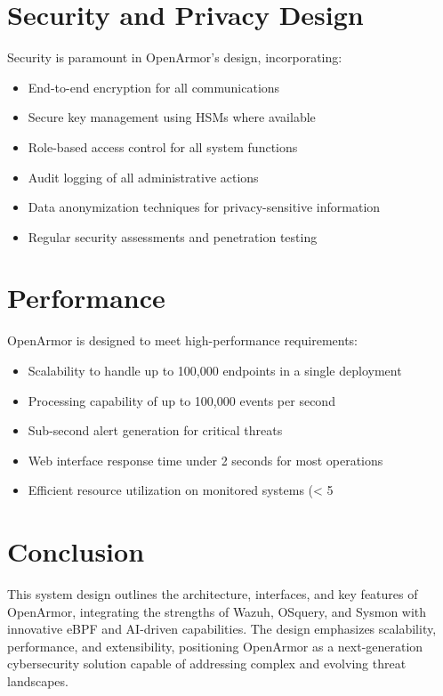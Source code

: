 \section{Security and Privacy Design}
Security is paramount in OpenArmor's design, incorporating:

\begin{itemize}
    \item End-to-end encryption for all communications
    \item Secure key management using HSMs where available
    \item Role-based access control for all system functions
    \item Audit logging of all administrative actions
    \item Data anonymization techniques for privacy-sensitive information
    \item Regular security assessments and penetration testing
\end{itemize}

\section{Performance}
OpenArmor is designed to meet high-performance requirements:

\begin{itemize}
    \item Scalability to handle up to 100,000 endpoints in a single deployment
    \item Processing capability of up to 100,000 events per second
    \item Sub-second alert generation for critical threats
    \item Web interface response time under 2 seconds for most operations
    \item Efficient resource utilization on monitored systems (< 5%
\end{itemize}

\section{Conclusion}
This system design outlines the architecture, interfaces, and key features of OpenArmor, integrating the strengths of Wazuh, OSquery, and Sysmon with innovative eBPF and AI-driven capabilities. The design emphasizes scalability, performance, and extensibility, positioning OpenArmor as a next-generation cybersecurity solution capable of addressing complex and evolving threat landscapes.